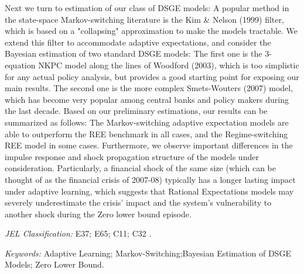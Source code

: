 \documentclass[12pt,reqno]{article}
\numberwithin{equation}{section}
\begin{document}
Next we turn to estimation of our class of DSGE models: A popular method in the state-space Markov-switching literature is the Kim \& Nelson (1999) 
filter, which is based on a "collapsing" approximation to make the models tractable. We extend this filter to accommodate adaptive expectations,
and consider the Bayesian estimation of two standard DSGE models: The first one is the 3-equation NKPC model along the lines of  Woodford (2003), which 
is too simplistic for any actual policy analysis, but provides a good starting point for exposing our main results. The second one is the more complex Smets-Wouters (2007)
model, which has become very popular among central banks and policy makers during the last decade. Based on our preliminary estimations, 
our results can be summarized as follows: The Markov-switching adaptive expectation models are able to outperform the REE benchmark in all 
cases, and the Regime-switching REE model in some cases. Furthermore, we observe important differences in the impulse response and shock
propagation structure of the models under consideration. Particularly, a financial shock of the same size (which can be thought of as the
financial crisis of 2007-08) typically has a longer lasting impact under adaptive learning, which suggests that Rational Expectations models
may severely underestimate the crisis' impact and the system's vulnerability to another shock during the Zero lower bound episode. \\


\vspace{3 mm}

\noindent
\textit{JEL Classification:} E37; E65; C11; C32 . \\


\vspace{3 mm}

\noindent
\textit{Keywords:} Adaptive Learning; Markov-Switching;Bayesian Estimation of DSGE Models; Zero Lower Bound. 



\end{document}
